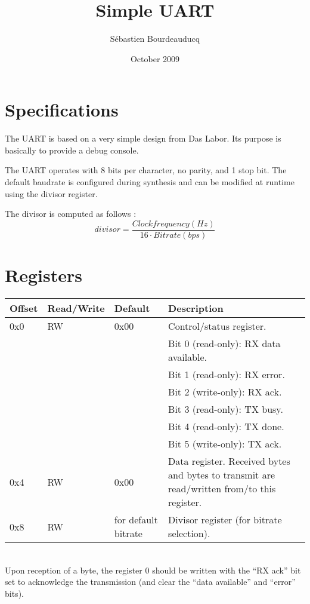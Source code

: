 \documentclass[a4paper,11pt]{article}
\title{Simple UART}
\author{S\'ebastien Bourdeauducq}
\date{October 2009}
\begin{document}
\setlength{\parindent}{0pt}
\setlength{\parskip}{5pt}
\maketitle{}
\section{Specifications}
The UART is based on a very simple design from Das Labor. Its purpose is basically to provide a debug console.

The UART operates with 8 bits per character, no parity, and 1 stop bit. The default baudrate is configured during synthesis and can be modified at runtime using the divisor register.

The divisor is computed as follows :
\begin{equation*}
divisor = \frac{Clock frequency (Hz)}{16 \cdot Bitrate (bps)}
\end{equation*}

\section{Registers}

\begin{tabularx}{\textwidth}{|l|l|l|X|}
\hline
\bf{Offset} & \bf{Read/Write} & \bf{Default} & \bf{Description} \\
\hline
0x0 & RW & 0x00 & Control/status register.\\
& & & Bit 0 (read-only): RX data available.\\
& & & Bit 1 (read-only): RX error.\\
& & & Bit 2 (write-only): RX ack.\\
& & & Bit 3 (read-only): TX busy.\\
& & & Bit 4 (read-only): TX done.\\
& & & Bit 5 (write-only): TX ack. \\
\hline
0x4 & RW & 0x00 & Data register. Received bytes and bytes to transmit are read/written from/to this register. \\
\hline
0x8 & RW & for default bitrate & Divisor register (for bitrate selection). \\
\hline
\end{tabularx}\\

Upon reception of a byte, the register 0 should be written with the ``RX ack'' bit set to acknowledge the transmission (and clear the ``data available'' and ``error'' bits).
\end{document}
